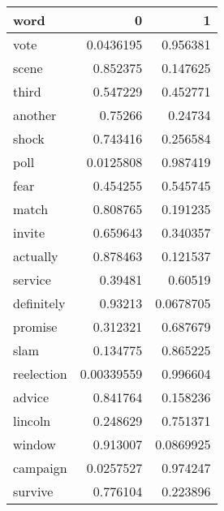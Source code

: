 \begin{tabular}{lrr}
\hline
 word       &          0 &         1 \\
\hline
 vote       & 0.0436195  & 0.956381  \\
 scene      & 0.852375   & 0.147625  \\
 third      & 0.547229   & 0.452771  \\
 another    & 0.75266    & 0.24734   \\
 shock      & 0.743416   & 0.256584  \\
 poll       & 0.0125808  & 0.987419  \\
 fear       & 0.454255   & 0.545745  \\
 match      & 0.808765   & 0.191235  \\
 invite     & 0.659643   & 0.340357  \\
 actually   & 0.878463   & 0.121537  \\
 service    & 0.39481    & 0.60519   \\
 definitely & 0.93213    & 0.0678705 \\
 promise    & 0.312321   & 0.687679  \\
 slam       & 0.134775   & 0.865225  \\
 reelection & 0.00339559 & 0.996604  \\
 advice     & 0.841764   & 0.158236  \\
 lincoln    & 0.248629   & 0.751371  \\
 window     & 0.913007   & 0.0869925 \\
 campaign   & 0.0257527  & 0.974247  \\
 survive    & 0.776104   & 0.223896  \\
\hline
\end{tabular}